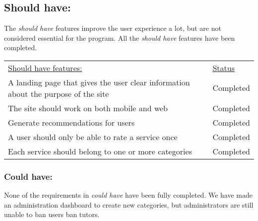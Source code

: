 
\subsection{Should have:}
The \textit{should have} features improve the user experience a lot, but are not considered essential for the program.
All the \textit{should have} features have been completed.

\begin{table}[h]
    \begin{tabularx}{\textwidth}{|X|l|}
    \underline{Should have features:}                                                                 & \underline{Status} \\
    A landing page that gives the user clear information about the purpose of the site                & Completed \\
    The site should work on both mobile and web                                                       & Completed \\
    Generate recommendations for users                                                                & Completed \\
    A user should only be able to rate a service once                                                 & Completed \\
    Each service should belong to one or more categories                                              & Completed \\
   \end{tabularx}
\end{table}

\subsubsection{Could have:}
None of the requirements in \textit{could have} have been fully completed.
We have made an administration dashboard to create new categories, but administrators are still unable to ban users ban tutors.


